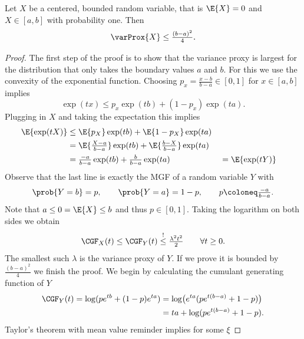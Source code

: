 \begin{mdframed}[innertopmargin=0pt]
\begin{lemma}
    \label{lem: hoeffding's lemma}
    Let \(X\) be a centered, bounded random variable, that is 
    \(\E{X}=0\) and \(X\in [a,b]\) with probability one. Then
    \[
        \varProx{X} \le \tfrac{(b-a)^2}4.
    \]
\end{lemma}
\end{mdframed}
\begin{proof}
    The first step of the proof is to show that the variance proxy is largest
    for the distribution that only takes the boundary values \(a\) and \(b\).
    For this we use the convexity of the exponential function. 
    Choosing \(p_x=\frac{x-b}{b-a}\in [0,1]\) for \(x\in [a,b]\) implies
    \[
        \exp(t x) \le p_x \exp(t b) + (1-p_x) \exp(t a).
    \]
    Plugging in \(X\) and taking the expectation this implies
    \[\begin{aligned}
        \E{\exp(t X)}
        &\le \E{p_X} \exp(t b) + \E{1-p_X} \exp(t a)
        \\
        &= \E{\tfrac{X-a}{b-a}} \exp(t b) + \E{\tfrac{b-X}{b-a}} \exp(t a)
        \\
        &= \tfrac{-a}{b-a}\exp(t b) + \tfrac{b}{b-a}\exp(t a)
        &&= \E{\exp(t Y)}
    \end{aligned}
    \]
    Observe that the last line is exactly the MGF of a random variable \(Y\)
    with
    \[
        \prob{Y=b} = p,
        \qquad
        \prob{Y=a} = 1-p,
        \qquad p \coloneq \tfrac{-a}{b-a}.
    \]
    Note that \(a\le 0=\E{X} \le b\) and thus \(p\in [0,1]\).
    Taking the logarithm on both sides we obtain
    \begin{equation}
        \label{eq: rademacher are worst offender}
        \CGF_X(t) \le \CGF_Y(t) \overset{!}\le \tfrac{\lambda^2 t^2}{2}
        \qquad \forall t\ge 0.
    \end{equation}
    The smallest such \(\lambda\) is the variance proxy of \(Y\).
    If we prove it is bounded by \(\frac{(b-a)^2}{4}\) we finish the proof.
    We begin by calculating the cumulant generating function of \(Y\) 
    \[\begin{aligned}
        \CGF_Y(t)
        = \log(p e^{t b} + (1-p) e^{t a})
        &= \log\bigl(e^{ta}(p e^{t (b-a)} + 1-p)\bigr)
        \\
        &= ta + \log(pe^{t(b-a)}+1-p).
    \end{aligned}
    \]
    Taylor's theorem with mean value reminder implies for some \(\xi\)

\end{proof}
